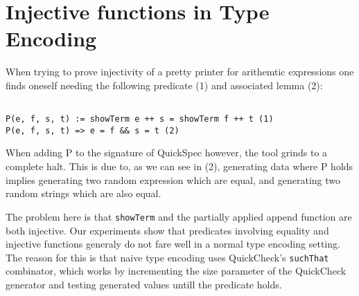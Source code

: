 \section{Injective functions in Type Encoding}
When trying to prove injectivity of a pretty printer for arithemtic expressions one
finds oneself needing the following predicate (1) and associated lemma (2):
\begin{verbatim}

P(e, f, s, t) := showTerm e ++ s = showTerm f ++ t (1)
P(e, f, s, t) => e = f && s = t (2)

\end{verbatim}
When adding P to the signature of QuickSpec however, the tool grinds to a complete halt. This is
due to, as we can see in (2), generating data where P holds implies generating two
random expression which are equal, and generating two random strings which are also equal.

The problem here is that \texttt{showTerm} and the partially applied append function are both injective.
Our experiments show that predicates involving equality and injective functions generaly do not
fare well in a normal type encoding setting. The reason for this is that naive type encoding uses
QuickCheck's \texttt{suchThat} combinator, which works by incrementing the size parameter of the QuickCheck
generator and testing generated values untill the predicate holds.

